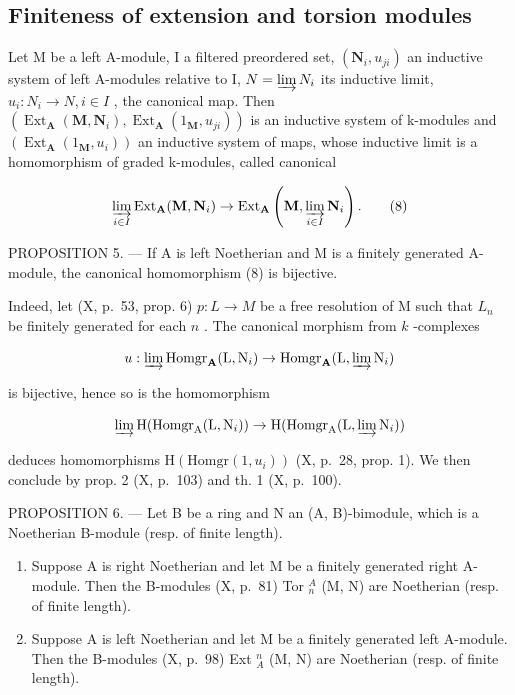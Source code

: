 \subsection{Finiteness of extension and torsion modules}

Let M be a left A-module, I a filtered preordered set, \((\mathbf{N}_{i}, u_{ji})\) an inductive system of left A-modules relative to I, \(N = \varinjlim N_{i}\) its inductive limit, \(u_{i}: N_{i} \to N, i \in I\) , the canonical map. Then \((\operatorname{Ext}_{\mathbf{A}}(\mathbf{M}, \mathbf{N}_{i}), \operatorname{Ext}_{\mathbf{A}}(1_{\mathbf{M}}, u_{ji}))\) is an inductive system of k-modules and \((\operatorname{Ext}_{\mathbf{A}}(1_{\mathbf{M}}, u_{i}))\) an inductive system of maps, whose inductive limit is a homomorphism of graded k-modules, called canonical

\[
\varinjlim_ {i \in I} \operatorname{Ext} _ {\mathbf {A}} (\mathbf {M}, \mathbf {N} _ {i}) \rightarrow \operatorname{Ext} _ {\mathbf {A}} \left(\mathbf {M}, \varinjlim_ {i \in I} \mathbf {N} _ {i}\right).\tag{8}
\]

PROPOSITION 5. --- If A is left Noetherian and M is a finitely generated A-module, the canonical homomorphism (8) is bijective.

Indeed, let (X, p.~53, prop. 6) \(p: L \to M\) be a free resolution of M such that \(L_{n}\) be finitely generated for each \(n\) . The canonical morphism from \(k\) -complexes

\[
u: \varinjlim \operatorname{Homgr} _ {\mathbf {A}} (\mathrm{L}, \mathrm{N} _ {i}) \rightarrow \operatorname{Homgr} _ {\mathbf {A}} (\mathrm{L}, \varinjlim \mathrm{N} _ {i})
\]

is bijective, hence so is the homomorphism

\[
\varinjlim \mathrm{H} (\operatorname{Homgr} _ {\mathrm{A}} (\mathrm{L}, \mathrm{N} _ {i})) \rightarrow \mathrm{H} (\operatorname{Homgr} _ {\mathrm{A}} (\mathrm{L}, \varinjlim \mathrm{N} _ {i}))
\]

deduces homomorphisms \(\mathrm{H}(\mathrm{Homgr}(1,u_{i}))\) (X, p.~28, prop. 1). We then conclude by prop. 2 (X, p.~103) and th. 1 (X, p.~100).

PROPOSITION 6. --- Let B be a ring and N an (A, B)-bimodule, which is a Noetherian B-module (resp. of finite length).

\begin{enumerate}
\def\labelenumi{\alph{enumi})}
\item
  Suppose A is right Noetherian and let M be a finitely generated right A-module. Then the B-modules (X, p.~81) Tor \(_{n}^{A}\) (M, N) are Noetherian (resp. of finite length).
\item
  Suppose A is left Noetherian and let M be a finitely generated left A-module. Then the B-modules (X, p.~98) Ext \(_{A}^{n}\) (M, N) are Noetherian (resp. of finite length).
\end{enumerate}

